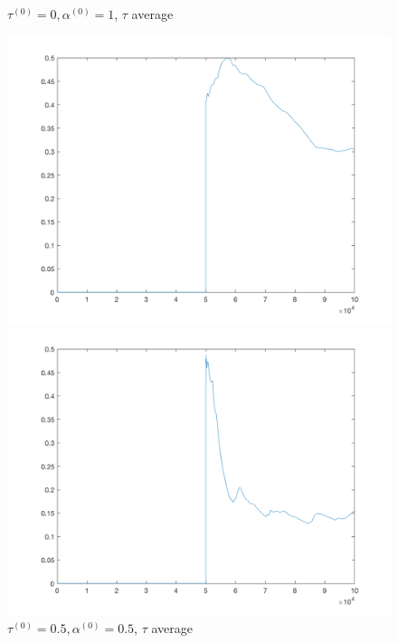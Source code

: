 \documentclass{siamart1116}
\begin{document}
\begin{figure}[!htb]
    \begin{minipage}{0.48\textwidth}
        \centering
        \caption{$\tau^{(0)} = 0, \alpha^{(0)} = 1$, $\tau$ average}
        \includegraphics[width=\linewidth]{zero_one_tau_avg.png}
    \end{minipage} \hfill
    \begin{minipage}{0.48\textwidth}
        \centering
        \caption{$\tau^{(0)} = 0.5, \alpha^{(0)} = 0.5$, $\tau$ average}
        \includegraphics[width=\linewidth]{half_half_tau_avg.png}
    \end{minipage}
\end{figure}
\end{document}
